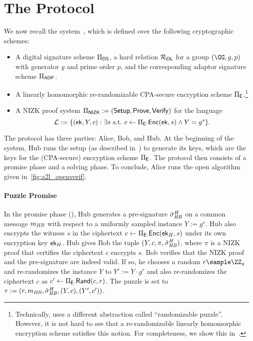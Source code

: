 \section{The \aal Protocol}\label{sec:description_a2l}

We now recall the \aal system~\cite{SP:TaiMorMaf21}, which is defined over the following cryptographic schemes:
\begin{itemize}
    \item A digital signature scheme $\Pi_{\mathsf{DS}}$, a hard relation $\mathcal{R}_{\mathsf{DL}}$ for a group $(\GG, g, p)$ with generator $g$ and prime order $p$, and the corresponding adaptor signature scheme $\Pi_{\mathsf{ADP}}$.
    \item A linearly homomorphic re-randomizable CPA-secure encryption scheme $\Pi_{\mathsf{E}}$.\footnote{Technically, \cite{SP:TaiMorMaf21} uses a different abstraction called ``randomizable puzzle''. However, it is not hard to see that a re-randomizable linearly homomorphic encryption scheme satisfies this notion. For completeness, we show this in~.}
    \item A NIZK proof system $\Pi_{\mathsf{NIZK}} := ({\mathsf{Setup}}, \mathsf{Prove}, {\mathsf{Verify}}) $ for the language $$\mathcal{L} := \{ (\mathsf{ek}, Y,c) : \exists s \mathrm{~s.t.~} c \gets \Pi_{\mathsf{E}}.{\mathsf{Enc}}(\mathsf{ek}, s) \land Y = g^s \}.$$
\end{itemize}
The protocol has three parties: Alice, Bob, and Hub. At the beginning of the system, Hub runs the setup (as described in~) to generate its keys, which are the keys for the (CPA-secure) encryption scheme $\Pi_{\mathsf{E}}$. The protocol then consists of a promise phase and a solving phase. To conclude, Alice runs the open algorithm given in~\cref{fig:a2l_openverif}.



\paragraph{Puzzle Promise} 
In the promise phase (), 
Hub generates a pre-signature $\tilde{\sigma}_{\mathit{HB}}^H$ on a common message $ m_{\mathit{HB}}$ with respect to a uniformly sampled instance $Y := g^s$. Hub also encrypts the witness $s$ in the ciphertext $c \gets \Pi_{\mathsf{E}}.{\mathsf{Enc}}(\mathsf{ek}_H,s)$ under its own encryption key $\mathsf{ek}_H$. Hub gives Bob the tuple $(Y, c, \pi, \tilde{\sigma}_{\mathit{HB}}^H)$, where $\pi$ is a NIZK proof that certifies the ciphertext $c$ encrypts $s$.
Bob verifies that the NIZK proof and the pre-signature are indeed valid. If so, he chooses a random $r \sample \ZZ_q$ and re-randomizes the instance $Y$ to $Y' := Y \cdot g^r$ and also re-randomizes the ciphertext $c$ as $c' \gets \Pi_{\mathsf{E}}.\mathsf{Rand}(c,r)$. The puzzle is set to $\tau := (r, m_{\mathit{HB}}, \tilde{\sigma}_{\mathit{HB}}^H, (Y,c), (Y', c'))$. 

